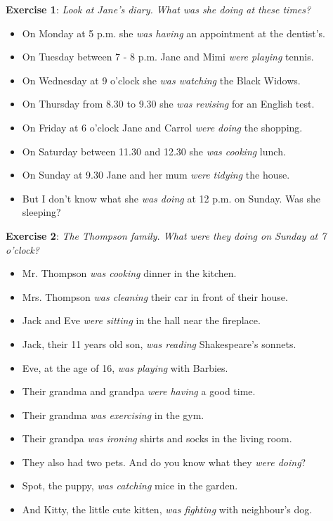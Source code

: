 \textbf{Exercise 1}: \textit{Look at Jane's diary. What was she doing at these times?}

\begin{itemize}
\item On Monday at 5 p.m. she \textit{was having} an appointment at the dentist's.
\item On Tuesday between 7 - 8 p.m. Jane and Mimi \textit{were playing} tennis.
\item On Wednesday at 9 o'clock she \textit{was watching} the Black Widows.
\item On Thursday from 8.30 to 9.30 she \textit{was revising} for an English test.
\item On Friday at 6 o'clock Jane and Carrol \textit{were doing} the shopping.
\item On Saturday between 11.30 and 12.30 she \textit{was cooking} lunch.
\item On Sunday at 9.30 Jane and her mum \textit{were tidying} the house.
\item But I don't know what she \textit{was doing} at 12 p.m. on Sunday. Was she sleeping?

\end{itemize}

\textbf{Exercise 2}: \textit{The Thompson family. What were they doing on Sunday at 7 o'clock?}

\begin{itemize}

\item Mr. Thompson \textit{was cooking} dinner in the kitchen.
\item Mrs. Thompson \textit{was cleaning} their car in front of their house.
\item Jack and Eve \textit{were sitting} in the hall near the fireplace.
\item Jack, their 11 years old son, \textit{was reading} Shakespeare's sonnets.
\item Eve, at the age of 16, \textit{was playing} with Barbies.
\item Their grandma and grandpa \textit{were having} a good time.
\item Their grandma \textit{was exercising} in the gym.
\item Their grandpa \textit{was ironing} shirts and socks in the living room.
\item They also had two pets. And do you know what they \textit{were doing}?
\item Spot, the puppy, \textit{was catching} mice in the garden.
\item And Kitty, the little cute kitten, \textit{was fighting} with neighbour's dog.

\end{itemize}

